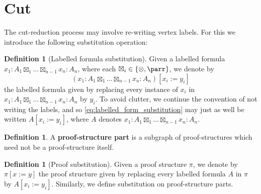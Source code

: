 \documentclass[12pt]{article}
\theoremstyle{plain}
\theoremstyle{definition}
\newtheorem{defn}[thm]{Definition} %
\begin{document}
\section{Cut}
The cut-reduction process may involve re-writing vertex labels. For this we introduce the following substitution operation:
\begin{defn}[Labelled formula substitution]
Given a labelled formula $x_1: A_1 \boxtimes_{1} \hdots \boxtimes_{n-1} x_n: A_n$, where each $\boxtimes_i \in \lbrace \otimes, \parr \rbrace$, we denote by
\begin{equation}\label{eq:labelled_form_substitution}
(x_1: A_1 \boxtimes_{1} \hdots \boxtimes_{n-1} x_n: A_n)[x_i := y_i]
\end{equation}
the labelled formula given by replacing every instance of $x_i$ in $x_1: A_1 \boxtimes_{1} \hdots \boxtimes_{n-1} x_n: A_n$ by $y_i$. To avoid clutter, we continue the convention of not writing the labels, and so \eqref{eq:labelled_form_substitution} may just as well be written $A[x_i := y_i]$, where $A$ denotes $x_1: A_1 \boxtimes_{1} \hdots \boxtimes_{n-1} x_n: A_n$.
\end{defn}
\begin{defn}\label{def:proof_structure_parts}
A \textbf{proof-structure part} is a subgraph of proof-structures which need not be a proof-structure itself.
\end{defn}
\begin{defn}[Proof substitution]
Given a proof structure $\pi$, we denote by $\pi[x:=y]$ the proof structure given by replacing every labelled formula $A$ in $\pi$ by $A[x_i := y_i]$. Similarly, we define substitution on proof-structure parts. 
\end{defn}
\end{document}
